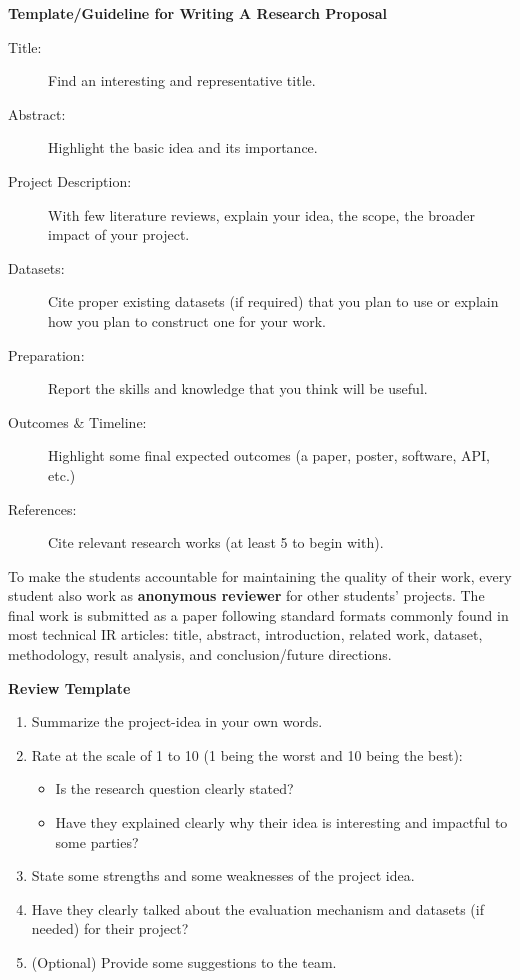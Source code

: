 \documentclass{article}
\begin{document}
\begin{mdframed}
{\bf Template/Guideline for Writing A Research Proposal}
\begin{description}
\item [Title:] Find an interesting and representative title.
\item [Abstract:] Highlight the basic idea and its importance.
\item [Project Description:] With few literature reviews, explain your idea, the scope, the broader impact of your project.
\item [Datasets:] Cite proper existing datasets (if required) that you plan to use or explain how you plan to construct one for your work. 
\item [Preparation:] Report the skills and knowledge that you think will be useful.
\item [Outcomes \& Timeline:] Highlight some final expected outcomes (a paper, poster, software, API, etc.)
\item [References:] Cite relevant research works (at least 5 to begin with).
\end{description}
\end{mdframed}
\par To make the students accountable for maintaining the quality of their work, every student also work as {\bf anonymous reviewer} for other students' projects. The final work is  submitted as a paper following standard formats commonly found in most technical IR articles: title, abstract, introduction, related work, dataset, methodology, result analysis, and conclusion/future directions.

\begin{mdframed}
{\bf Review Template}
\begin{enumerate}
\item Summarize the project-idea in your own words.
\item Rate at the scale of 1 to 10 (1 being the worst and 10 being the best):
	\begin{itemize}
	\item Is the research question clearly stated?
	\item Have they explained clearly why their idea is interesting and impactful to some parties?
	\end{itemize}
\item State some strengths and some weaknesses of the project idea.
\item Have they clearly talked about the evaluation mechanism and datasets (if needed) for their project?
\item (Optional) Provide some suggestions to the team. 
\end{enumerate}
\end{mdframed}
\end{document}
